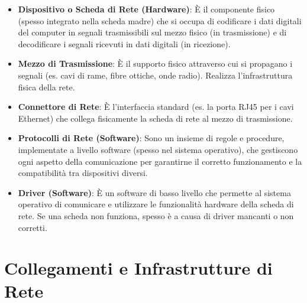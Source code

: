 \begin{itemize}
    \item \textbf{Dispositivo o Scheda di Rete (Hardware)}: È il componente fisico (spesso integrato nella scheda madre) che si occupa di codificare i dati digitali del computer in segnali trasmissibili sul mezzo fisico (in trasmissione) e di decodificare i segnali ricevuti in dati digitali (in ricezione).
    \item \textbf{Mezzo di Trasmissione}: È il supporto fisico attraverso cui si propagano i segnali (es. cavi di rame, fibre ottiche, onde radio). Realizza l'infrastruttura fisica della rete.
    \item \textbf{Connettore di Rete}: È l'interfaccia standard (es. la porta RJ45 per i cavi Ethernet) che collega fisicamente la scheda di rete al mezzo di trasmissione.
    \item \textbf{Protocolli di Rete (Software)}: Sono un insieme di regole e procedure, implementate a livello software (spesso nel sistema operativo), che gestiscono ogni aspetto della comunicazione per garantirne il corretto funzionamento e la compatibilità tra dispositivi diversi.
    \item \textbf{Driver (Software)}: È un software di basso livello che permette al sistema operativo di comunicare e utilizzare le funzionalità hardware della scheda di rete. Se una scheda non funziona, spesso è a causa di driver mancanti o non corretti.
\end{itemize}



\section{Collegamenti e Infrastrutture di Rete}

